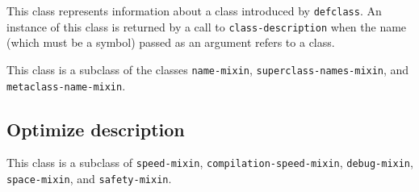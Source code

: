 {\footnotesize
{}
}

This class represents information about a class introduced by
\texttt{defclass}.  An instance of this class is returned by a call to
\texttt{class-description} when the name (which must be a symbol)
passed as an argument refers to a class.

This class is a subclass of the classes \texttt{name-mixin},
\texttt{superclass-names-mixin},  and
\texttt{metaclass-name-mixin}.

\subsection{Optimize description}
\label{sec-instantiable-classes-optimize-desciption}

{\footnotesize
{}
}

This class is a subclass of \texttt{speed-mixin},
\texttt{compilation-speed-mixin}, \texttt{debug-mixin},
\texttt{space-mixin}, and \texttt{safety-mixin}.
